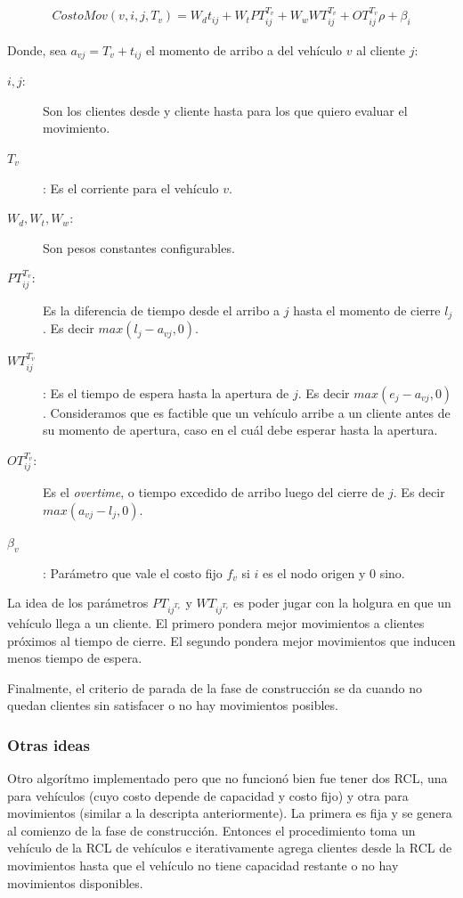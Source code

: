 \documentclass{article}
\begin{document}
  \begin{align}
    CostoMov(v, i, j, T_v) = W_d t_{ij} + W_t PT_{ij}^{T_v} + W_w WT_{ij}^{T_v} + OT_{ij}^{T_v} \rho + \beta_i
  \end{align}
  
  Donde, sea $a_{vj} = T_v + t_{ij}$ el momento de arribo a del vehículo $v$ al cliente $j$:
  \begin{description}
    \item[$i, j$:] Son los clientes desde y cliente hasta para los que quiero evaluar el movimiento.
    \item[$T_v$]: Es el corriente para el vehículo $v$.
    \item[$W_d, W_t, W_w$:] Son pesos constantes configurables.
    \item[$PT_{ij}^{T_v}$:] Es la diferencia de tiempo desde el arribo a $j$ hasta el momento de cierre $l_j$. Es decir $max(l_j - a_{vj}, 0)$.
    \item[$WT_{ij}^{T_v}$]: Es el tiempo de espera hasta la apertura de $j$. Es decir $max(e_j - a_{vj}, 0)$. Consideramos que es factible que un vehículo arribe a un cliente antes de su momento de apertura, caso en el cuál debe esperar hasta la apertura.
    \item[$OT_{ij}^{T_v}$:] Es el {\it overtime}, o tiempo excedido de arribo luego del cierre de $j$. Es decir $max(a_{vj} - l_j, 0)$.
    \item[$\beta_v$]: Parámetro que vale el costo fijo $f_v$ si $i$ es el nodo origen y $0$ sino.
  \end{description}

  La idea de los parámetros $PT_{ij^{T_v}}$ y $WT_{ij^{T_v}}$ es poder jugar con la holgura en que un vehículo llega a un cliente. El primero pondera mejor movimientos a clientes próximos al tiempo de cierre. El segundo pondera mejor movimientos que inducen menos tiempo de espera.

  Finalmente, el criterio de parada de la fase de construcción se da cuando no quedan clientes sin satisfacer o no hay movimientos posibles.

  \subsubsection*{Otras ideas}

  Otro algorítmo implementado pero que no funcionó bien fue tener dos RCL, una para vehículos (cuyo costo depende de capacidad y costo fijo) y otra para movimientos (similar a la descripta anteriormente).
  La primera es fija y se genera al comienzo de la fase de construcción. Entonces el procedimiento toma un vehículo de la RCL de vehículos e iterativamente agrega clientes desde la RCL de movimientos hasta que el vehículo no tiene capacidad restante o no hay movimientos disponibles.
\end{document}
